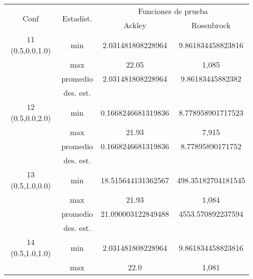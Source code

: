 \documentclass{report}
\begin{document}
    \begin{table}[H]
        \centering
        \begin{tabular}{|c|c|c|c|}
        \hline
        \multirow{2}{*}{Conf} & \multirow{2}{*}{Estadíst.} & \multicolumn{2}{c|}{Funciones de prueba} \\ \cline{3-4}
                            &                             & Ackley & Rosenbrock \\ \hline

        11 (0.5,0.0,1.0)  & min                         &      2.031481808228964      &   9.861834458823816     \\ \cline{2-4} 
                              & max                         &     22.05       &   1,085     \\ \cline{2-4} 
                              & promedio                    &       2.031481808228964     &    9.86183445882382    \\ \cline{2-4} 
                              & des. est.                   &            &        \\ \hline
        12 (0.5,0.0,2.0)                   & min                         &     0.1668246681319836       &   8.778958901717523     \\ \cline{2-4} 
                              & max                         &       21.93     &   7,915     \\ \cline{2-4} 
                              & promedio                    &      0.1668246681319836      &     8.77895890171752    \\ \cline{2-4} 
                              & des. est.                   &            &        \\ \hline
        13 (0.5,1.0,0.0)                   & min                         &       18.515644131362567     &   498.35182704181545     \\ \cline{2-4} 
                              & max                         &     21.93       &   1,084     \\ \cline{2-4} 
                              & promedio                    &    21.090003122849488        &    4553.570892237594    \\ \cline{2-4} 
                              & des. est.                   &            &        \\ \hline
        14 (0.5,1.0,1.0)                   & min                         &      2.031481808228964      &  9.861834458823816      \\ \cline{2-4} 
                              & max                         &     22.0       &    1,081    \\ \cline{2-4} 

\end{tabular}
\end{table}
\end{document}
